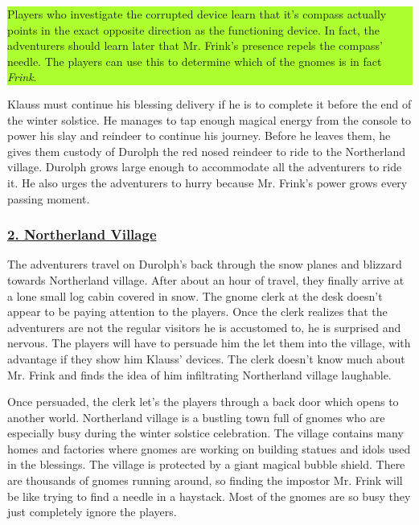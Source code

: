 \documentclass{article}
\begin{document}
\begin{multicols*}{2}
	\colorbox{GreenYellow}{\begin{minipage}{0.4\textwidth}
		Players who investigate the corrupted device learn that it's compass actually points in the exact opposite direction as the functioning device. In fact, the adventurers should learn later that Mr. Frink's presence repels the compass' needle. The players can use this to determine which of the gnomes is in fact \emph{Frink}. 			
	\end{minipage}}
	\break
	
	Klauss must continue his blessing delivery if he is to complete it before the end of the winter solstice. He manages to tap enough magical energy from the console to power his slay and reindeer to continue his journey. Before he leaves them, he gives them custody of Durolph the red nosed reindeer to ride to the Northerland village. Durolph grows large enough to accommodate all the adventurers to ride it. He also urges the adventurers to hurry because Mr. Frink's power grows every passing moment. 
	
	\subsubsection*{\underline{2. Northerland Village}}

	The adventurers travel on Durolph's back through the snow planes and blizzard towards Northerland village. After about an hour of travel, they finally arrive at a lone small log cabin covered in snow. The gnome clerk at the desk doesn't appear to be paying attention to the players. Once the clerk realizes that the adventurers are not the regular visitors he is accustomed to, he is surprised and nervous. The players will have to persuade him the let them into the village, with advantage if they show him Klauss' devices. The clerk doesn't know much about Mr. Frink and finds the idea of him infiltrating Northerland village laughable.
	
	Once persuaded, the clerk let's the players through a back door which opens to another world. Northerland village is a bustling town full of gnomes who are especially busy during the winter solstice celebration. The village contains many homes and factories where gnomes are working on building statues and idols used in the blessings. The village is protected by a giant magical bubble shield. There are thousands of gnomes running around, so finding the impostor Mr. Frink will be like trying to find a needle in a haystack. Most of the gnomes are so busy they just completely ignore the players.
	

\end{multicols*}
\end{document}
